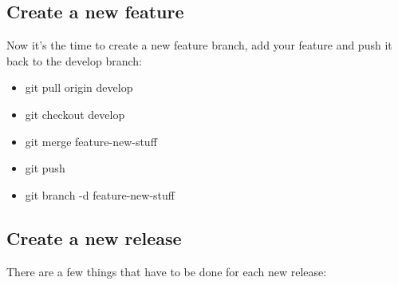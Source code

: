 \documentclass{article}
\begin{document}
\subsection{Create a new feature}
Now it's the time to create a new feature branch, add your feature and push it back to the develop branch:

\begin{itemize}
	\item git pull origin develop
	\item git checkout develop
	\item git merge feature-new-stuff
	\item git push
	\item git branch -d feature-new-stuff
\end{itemize}

\subsection{Create a new release}
There are a few things that have to be done for each new release:
\end{document}

